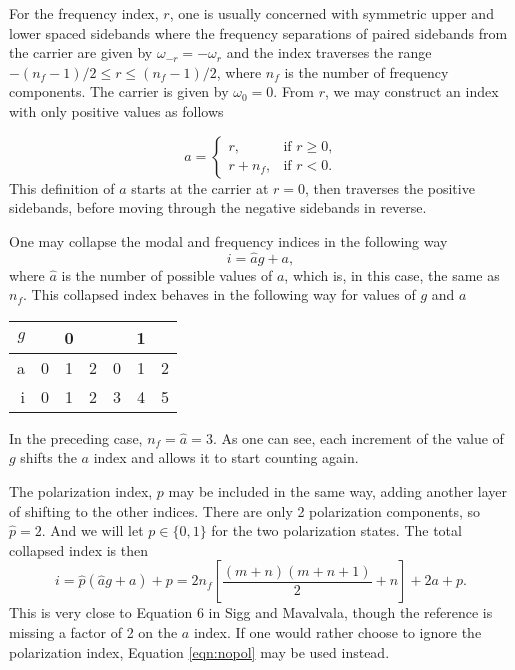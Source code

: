 For the frequency index, $r$, one is usually concerned with symmetric upper and lower spaced sidebands where the frequency separations of paired sidebands from the carrier are given by $\omega_{-r} = -\omega_{r}$ and the index traverses the range $-(n_f-1)/2\le r \le (n_f-1)/2$, where $n_f$ is the number of frequency components. %
The carrier is given by $\omega_0=0$. %
From $r$, we may construct an index with only positive values as follows

\begin{equation*}
a= 
\begin{cases} r, & \text{if $r \ge 0 $,}
\\
r+n_f, &\text{if $r < 0$.}
\end{cases}
\end{equation*}
 This definition of $a$ starts at the carrier at $r=0$, then traverses the positive sidebands, before moving through the negative sidebands in reverse.

One may collapse the modal and frequency indices in the following way
\begin{equation}
\label{eqn:nopol}
i = \hat{a}g + a,
\end{equation}
where $\hat{a}$ is the number of possible values of $a$, which is, in this case, the same as $n_f$. %
This collapsed index behaves in the following way for values of $g$ and $a$
\begin{center}
\begin{tabular}{ r| c c c | c c c}
$g$ & \multicolumn{3}{c|}{0} & \multicolumn{3}{c}{1} \\
\hline
a & 0 & 1 & 2 & 0 & 1 & 2 \\
\hline
i & 0 & 1 & 2 & 3 & 4 & 5
\end{tabular} 
\end{center}
In the preceding case, $n_f=\hat{a}=3$. %
As one can see, each increment of the value of $g$ shifts the $a$ index and allows it to start counting again.

The polarization index, $p$ may be included in the same way, adding another layer of shifting to the other indices. %
There are only 2 polarization components, so $\hat{p}=2$. %
And we will let $p \in \{0,1\}$ for the two polarization states. %
The total collapsed index is then
\begin{equation}
i = \hat{p}(\hat{a}g+a)+p=2n_f\left[\frac{(m+n)(m+n+1)}{2} + n\right]+2a+p.
\end{equation}
This is very close to Equation 6 in Sigg and Mavalvala, though the reference is missing a factor of 2 on the $a$ index. %
If one would rather choose to ignore the polarization index, Equation \ref{eqn:nopol} may be used instead.

